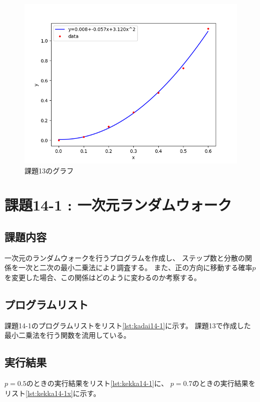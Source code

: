 \documentclass[a4j,titlepage]{jsarticle}
\begin{document}
\begin{figure}[H]
  \centering
  \includegraphics[width=13cm]{kadai13.png}
  \caption{課題13のグラフ}
  \label{graph11-2}
\end{figure}


\section{課題14-1 : 一次元ランダムウォーク}
\subsection{課題内容}
一次元のランダムウォークを行うプログラムを作成し、
ステップ数と分散の関係を一次と二次の最小二乗法により調査する。
また、正の方向に移動する確率$p$を変更した場合、この関係はどのように変わるのか考察する。

\subsection{プログラムリスト}
課題14-1のプログラムリストをリスト\ref{lst:kadai14-1}に示す。
課題13で作成した最小二乗法を行う関数を流用している。



\subsection{実行結果}
$p = 0.5$のときの実行結果をリスト\ref{lst:kekka14-1}に、
$p = 0.7$のときの実行結果をリスト\ref{lst:kekka14-1x}に示す。
\end{document}
